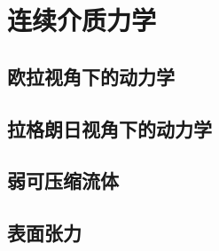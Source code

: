 \chapter{连续介质力学} \label{chap2}
\section{欧拉视角下的动力学}
\section{拉格朗日视角下的动力学}
\section{弱可压缩流体}
\section{表面张力}




